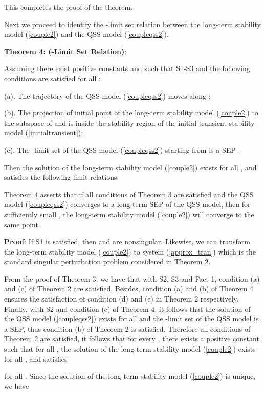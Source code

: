 \documentclass[journal]{IEEEtran}
\begin{document}
This completes the proof of the theorem.

Next we proceed to identify the -limit set relation between the long-term stability model (\ref{couple2}) and the QSS model (\ref{coupleqss2}).

\noindent\textbf{Theorem 4: (-Limit Set Relation)}:

Assuming there exist positive constants  and  such that S1-S3 and the following conditions are satisfied for all :

(a). The trajectory  of the QSS model (\ref{coupleqss2}) moves along ;

(b). The projection of initial point  of the long-term stability model (\ref{couple2}) to the subspace of  and  is inside the stability region  of the initial transient stability model (\ref{initialtransient});

(c). The -limit set of the QSS model (\ref{coupleqss2}) starting from  is a SEP .

Then the solution  of the long-term stability model (\ref{couple2}) exists for all , and satisfies the following limit relations:



Theorem 4 asserts that if all conditions of Theorem 3 are satisfied and the QSS model (\ref{coupleqss2}) converges to a long-term SEP of the QSS model, then for sufficiently small , the long-term stability model (\ref{couple2}) will converge to the same point.

\textbf{Proof}:
If S1 is satisfied, then  and  are nonsingular. Likewise, we can transform the long-term stability model (\ref{couple2}) to system (\ref{approx_tran}) which is the standard singular perturbation problem considered in Theorem 2.

From the proof of Theorem 3, we have that with S2, S3 and Fact 1, condition (a) and (c) of Theorem 2 are satisfied. Besides, condition (a) and (b) of Theorem 4 ensures the satisfaction of condition (d) and (e) in Theorem 2 respectively. Finally, with S2 and condition (c) of Theorem 4, it follows that the solution of the QSS model (\ref{coupleqss2}) exists for all  and the -limit set of the QSS model is a SEP, thus condition (b) of Theorem 2 is satisfied. Therefore all conditions of Theorem 2 are satisfied, it follows that for every , there exists a positive constant  such that for all , the solution  of the long-term stability model (\ref{couple2}) exists for all , and satisfies

for all . Since the solution of the long-term stability model (\ref{couple2}) is unique, we have
\end{document}
